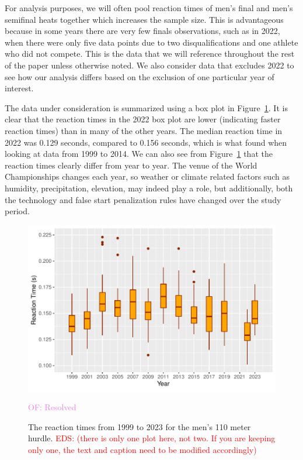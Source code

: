 \documentclass[12pt, letterpaper, titlepage]{article}
\newcommand{\eds}[1]{\textcolor{red}{EDS: (#1)}}
\newcommand{\of}[1]{\textcolor{violet}{OF: #1}}
\begin{document}
For analysis purposes, we will often pool reaction times of men's final and 
men's semifinal heats together which increases the sample size. This is 
advantageous because in some years there are very few finals observations, such
as in 2022, when there were only five data points due to two disqualifications 
and one athlete who did not compete.  This is the data that we will reference
throughout the rest of the paper unless otherwise noted. We also consider data 
that excludes 2022 to see how our analysis differs based on the exclusion of one
particular year of interest.


The data under consideration is summarized using a box plot in 
Figure~\ref{fig:Boxplot}.  It is clear that the reaction times in the 2022
box plot are lower (indicating faster reaction times) than in many of the other
years.  The median reaction time in 2022 was 0.129 seconds,  compared to 0.156
seconds, which is what \citet{brosnan2017effects} found when looking at data
from 1999 to 2014. We can also see from Figure~\ref{fig:Boxplot} that the 
reaction times clearly differ from year to year. The venue of the World 
Championships changes each year, so weather or climate related factors such as 
humidity, precipitation, elevation, may indeed play a role, but additionally,
both the technology and false start penalization rules have changed over the 
study period.


\begin{figure}[tbp]
  \centering
  \includegraphics{Boxplot}
  \caption{The reaction times from 1999 to 2023 for the men's 110 meter hurdle.
	\eds{there is only one plot here, not two. If you are keeping only one, the
	text and caption need to be modified accordingly}}
  \of{Resolved}
  \label{fig:Boxplot}
\end{figure}
\end{document}
